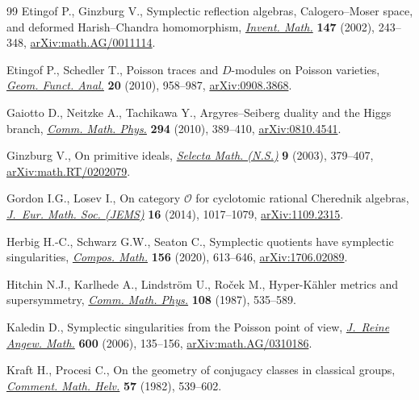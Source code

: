 \documentclass[pdftex]{sigma}
\numberwithin{equation}{section}
\begin{document}
\begin{thebibliography}{99}
Etingof P., Ginzburg V., Symplectic reflection algebras, {C}alogero--{M}oser
 space, and deformed {H}arish--{C}handra homomorphism, \href{https://doi.org/10.1007/s002220100171}{\textit{Invent. Math.}}
 \textbf{147} (2002), 243--348, \href{https://arxiv.org/abs/math.AG/0011114}{arXiv:math.AG/0011114}.

Etingof P., Schedler T., Poisson traces and {$D$}-modules on {P}oisson
 varieties, \href{https://doi.org/10.1007/s00039-010-0085-4}{\textit{Geom. Funct. Anal.}} \textbf{20} (2010), 958--987, \href{https://arxiv.org/abs/0908.3868}{arXiv:0908.3868}.

Gaiotto D., Neitzke A., Tachikawa Y., Argyres--{S}eiberg duality and the
 {H}iggs branch, \href{https://doi.org/10.1007/s00220-009-0938-6}{\textit{Comm. Math. Phys.}} \textbf{294} (2010), 389--410, \href{https://arxiv.org/abs/0810.4541}{arXiv:0810.4541}.

Ginzburg V., On primitive ideals, \href{https://doi.org/10.1007/s00029-003-0338-2}{\textit{Selecta Math. (N.S.)}} \textbf{9} (2003), 379--407, \href{https://arxiv.org/abs/math.RT/0202079}{arXiv:math.RT/0202079}.

Gordon I.G., Losev I., On category {$\mathcal{O}$} for cyclotomic rational
 {C}herednik algebras, \href{https://doi.org/10.4171/JEMS/454}{\textit{J.~Eur. Math. Soc. (JEMS)}} \textbf{16} (2014), 1017--1079, \href{https://arxiv.org/abs/1109.2315}{arXiv:1109.2315}.

Herbig H.-C., Schwarz G.W., Seaton C., Symplectic quotients have symplectic
 singularities, \href{https://doi.org/10.1112/s0010437x19007784}{\textit{Compos. Math.}} \textbf{156} (2020), 613--646, \href{https://arxiv.org/abs/1706.02089}{arXiv:1706.02089}.

Hitchin N.J., Karlhede A., Lindstr\"om U., Ro\v{c}ek M., Hyper-{K}\"{a}hler
 metrics and supersymmetry, \href{https://doi.org/10.1007/BF01214418}{\textit{Comm. Math. Phys.}} \textbf{108} (1987), 535--589.

Kaledin D., Symplectic singularities from the {P}oisson point of view,
 \href{https://doi.org/10.1515/CRELLE.2006.089}{\textit{J.~Reine Angew. Math.}} \textbf{600} (2006), 135--156,
 \href{https://arxiv.org/abs/math.AG/0310186}{arXiv:math.AG/0310186}.

Kraft H., Procesi C., On the geometry of conjugacy classes in classical groups,
 \href{https://doi.org/10.1007/BF02565876}{\textit{Comment. Math. Helv.}} \textbf{57} (1982), 539--602.


\end{thebibliography}
\end{document}
